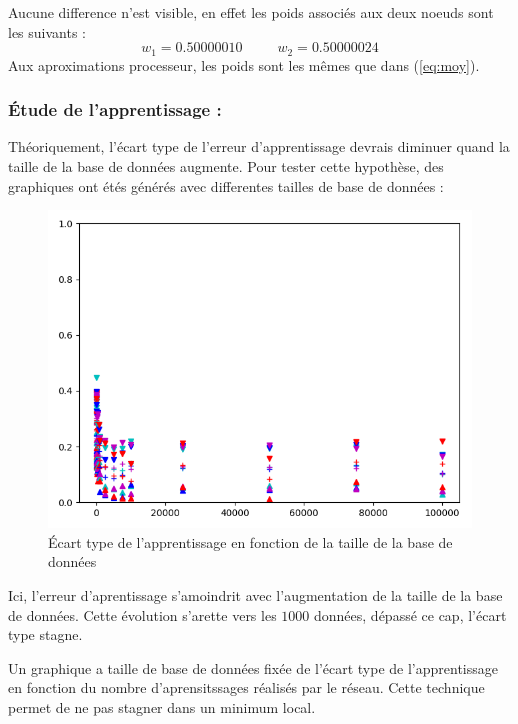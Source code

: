 Aucune difference n'est visible, en effet les poids associés aux deux noeuds sont les suivants :
\begin{equation*}
    w_1 = 0.50000010
    \;\;\;\;\;\;\;\;\;
    w_2 = 0.50000024
\end{equation*}
Aux aproximations processeur, les poids sont les mêmes que dans (\ref{eq:moy}).


\subsubsection{Étude de l'apprentissage :}\label{subsec:app}
Théoriquement, l'écart type de l'erreur d'apprentissage devrais
diminuer quand la taille de la base de données augmente.
Pour tester cette hypothèse, des graphiques ont étés générés avec
differentes tailles de base de données :

\begin{figure}[H]
    \center
    \includegraphics[height=\moyen]{pict/appfd.png}
	\caption{Écart type de l'apprentissage en fonction de la taille de la base de données}
	\label{fig:etfdata2graph}
\end{figure}
\vspace{-5pt}
Ici, l'erreur d'aprentissage s'amoindrit avec l'augmentation de la taille de la base de données.
Cette évolution s'arette vers les $1000$ données, dépassé ce cap, l'écart type stagne.


Un graphique a taille de base de données fixée de l'écart type de l'apprentissage
en fonction du nombre d'aprensitssages réalisés par le réseau.
Cette technique permet de ne pas stagner dans un minimum local.


